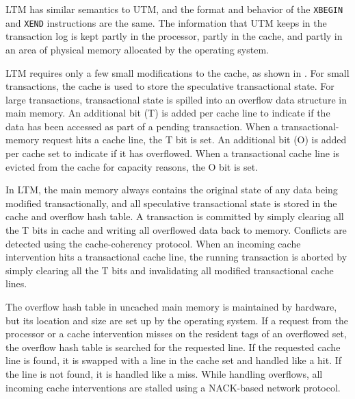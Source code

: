 LTM has similar semantics to UTM, and the format and behavior of
the \texttt{XBEGIN} and \texttt{XEND} instructions are the same.
The information that UTM keeps in the transaction log is
kept partly in the processor, partly in the cache, and partly in an
area of physical memory allocated by the operating system.


LTM requires only a few small modifications to the cache, as shown
in .  For small transactions, the cache is used to
store the speculative transactional state. For large transactions,
transactional state is spilled into an overflow data structure in main
memory. An additional bit (T) is added per cache line to indicate if
the data has been accessed as part of a pending transaction. When a
transactional-memory request hits a cache line, the T bit is set. An
additional bit (O) is added per cache set to indicate if it has
overflowed. When a transactional cache line is evicted from the cache
for capacity reasons, the O bit is set.

In LTM, the main memory always contains the original state of any
data being modified transactionally, and all speculative transactional
state is stored in the cache and overflow hash table.  A transaction
is committed by simply clearing all the T bits in cache and writing
all overflowed data back to memory. Conflicts are detected using the
cache-coherency protocol.  When an incoming cache intervention hits a
transactional cache line, the running transaction is aborted by simply
clearing all the T bits and invalidating all modified transactional
cache lines.

The overflow hash table in uncached main memory is maintained by
hardware, but its location and size are set up by the operating
system.  If a request from the processor or a cache intervention
misses on the resident tags of an overflowed set, the overflow hash
table is searched for the requested line.  If the requested cache line
is found, it is swapped with a line in the cache set and handled like
a hit.  If the line is not found, it is handled like a miss.  While
handling overflows, all incoming cache interventions are stalled using
a NACK-based network protocol.

